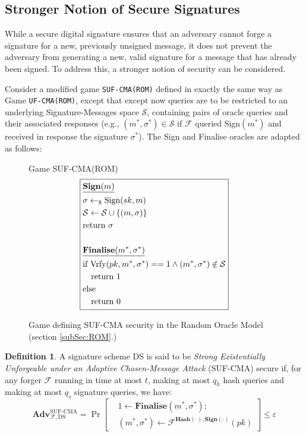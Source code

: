 \documentclass[]{final_report}
\theoremstyle{definition}
\newtheorem{definition}{Definition}[chapter]
\begin{document}
\subsection{Stronger Notion of Secure Signatures}
While a secure digital signature ensures that an adversary cannot forge a signature for a new, previously unsigned message, it does not prevent the adversary from generating a new, valid signature for a message that has already been signed. To address this, a stronger notion of security can be considered.

Consider a modified game \texttt{SUF-CMA(ROM)} defined in exactly the same way as Game \texttt{UF-CMA(ROM)}, except that except now queries are to be restricted to an underlying Signature-Messages space $\mathcal{S}$, containing pairs of oracle queries and their associated responses (e.g., $(m^*, \sigma^*) \in \mathcal{S}$ if  $\mathcal{F}$ queried Sign$(m^*)$ and received in response the signature $\sigma^*$). The Sign and Finalise oracles are adapted as follows:
\begin{figure}[H]
\centering
\hfill Game SUF-CMA(ROM)\hfill\phantom{} 
\[
\boxed{
\begin{aligned}
&\underline{\textbf{\text{Sign}}(m)} \\
&\sigma \leftarrow_{\$} \text{Sign}(sk, m) \\
&\mathcal{S} \leftarrow \mathcal{S} \cup\{(m, \sigma)\} \\
&\text{return } \sigma \\
\\
&\underline{\textbf{\text{Finalise}}(m^*, \sigma^*)} \\
&\text{if Vrfy}(pk, m^*, \sigma^*) == 1 \land (m^*, \sigma^*) \notin \mathcal{S} \\
&\quad \text{return } 1 \\
&\text{else} \\
&\quad \text{return } 0
\end{aligned}
}
\]
\caption{Game defining SUF-CMA security in the Random Oracle Model (section \ref{subSec:ROM}.)}
\label{fig:crypto_game}
\end{figure} 
\begin{definition}
A signature scheme DS is said to be \emph{Strong Existentially Unforgeable under an Adaptive Chosen-Message Attack} (SUF-CMA) secure if, for any forger \(\mathcal{F}\) running in time at most \(t\), making at most \(q_h\) hash queries and making at most \(q_s\) signature queries, we have:
\[
\textbf{Adv}_{\mathcal{F},\text{DS}}^{\text{SUF-CMA}} = \Pr \left[ \begin{aligned} &1 \leftarrow \textbf{Finalise}(m^*, \sigma^*); \\ &(m^*, \sigma^*) \leftarrow \mathcal{F}^{\textbf{Hash}(\cdot),\textbf{Sign}(\cdot)}(pk) \end{aligned} \right] \leq \varepsilon
\]\end{definition}
\end{document}
